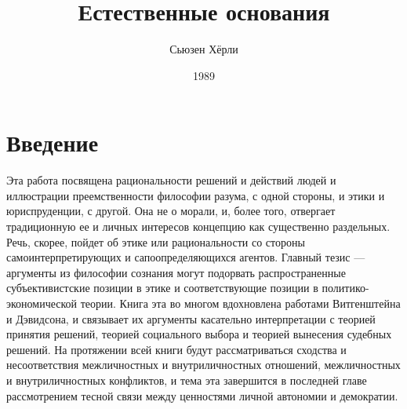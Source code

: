 \documentclass[11pt]{book}
\title{Естественные основания}
\author{Сьюзен Хёрли}
\date{1989}
\begin{document}

\null
    \thispagestyle{empty}%
    \addtocounter{page}{-1}%
    \newpage

\tableofcontents


\chapter{Введение}

Эта работа посвящена рациональности решений и действий людей и иллюстрации преемственности философии разума, с одной стороны, и этики и юриспруденции, с другой. Она не о морали, и, более того, отвергает традиционную ее и личных интересов концепцию как существенно раздельных. Речь, скорее, пойдет об этике или рациональности со стороны самоинтерпретирующих и сапоопределяющихся агентов. Главный тезис --- аргументы из философии сознания могут подорвать распространенные субъективистские позиции в этике и соответствующие позиции в политико-экономической теории. Книга эта во многом вдохновлена работами Витгенштейна и Дэвидсона, и связывает их аргументы касательно интерпретации с теорией принятия решений, теорией социального выбора и теорией вынесения судебных решений. На протяжении всей книги будут рассматриваться сходства и несоответствия межличностных и внутриличностных отношений, межличностных и внутриличностных конфликтов, и тема эта завершится в последней главе рассмотрением тесной связи между ценностями личной автономии и демократии.
\end{document}
